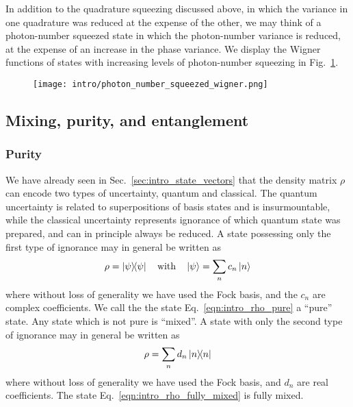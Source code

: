In addition to the quadrature squeezing discussed above, in which the variance in one quadrature was reduced at the expense of the other, we may think of a photon-number squeezed state in which the photon-number variance is reduced, at the expense of an increase in the phase variance. We display the Wigner functions of states with increasing levels of photon-number squeezing in Fig.~\ref{fig:intro_photon_number_squeezed_wigner}.

\begin{figure}[htp]
\centering
\captionsetup{width=0.8\linewidth}
\texttt{[image: intro/photon\_number\_squeezed\_wigner.png]}
\caption{\label{fig:intro_photon_number_squeezed_wigner}}
\end{figure}



\subsection{Mixing, purity, and entanglement}

\subsubsection{Purity}
We have already seen in Sec.~\ref{sec:intro_state_vectors} that the density matrix $\rho$ can encode two types of uncertainty, quantum and classical. The quantum uncertainty is related to superpositions of basis states and is insurmountable, while the classical uncertainty represents ignorance of which quantum state was prepared, and can in principle always be reduced. A state possessing only the first type of ignorance may in general be written as
\begin{equation}\label{eqn:intro_rho_pure}
\rho = \dyad{\psi} \qq{with} \ket{\psi} = \sum_n c_n \ket{n}
\end{equation}
where without loss of generality we have used the Fock basis, and the $c_n$ are complex coefficients. We call the the state Eq.~\ref{eqn:intro_rho_pure} a ``pure'' state. Any state which is not pure is ``mixed''. A state with only the second type of ignorance may in general be written as
\begin{equation}\label{eqn:intro_rho_fully_mixed}
\rho = \sum_n d_n \dyad{n}
\end{equation}
where without loss of generality we have used the Fock basis, and $d_n$ are real coefficients. The state Eq.~\ref{eqn:intro_rho_fully_mixed} is fully mixed.

